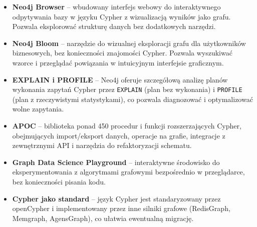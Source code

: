 \begin{itemize}
    \item \textbf{Neo4j Browser} -- wbudowany interfejs webowy do
    interaktywnego odpytywania bazy w języku Cypher z wizualizacją
    wyników jako grafu. Pozwala eksplorować strukturę danych bez
    dodatkowych narzędzi.
    \item \textbf{Neo4j Bloom} -- narzędzie do wizualnej eksploracji
    grafu dla użytkowników biznesowych, bez konieczności znajomości
    Cypher. Pozwala wyszukiwać wzorce i przeglądać powiązania
    w intuicyjnym interfejsie graficznym.
    \item \textbf{EXPLAIN i PROFILE} -- Neo4j oferuje szczegółową analizę
    planów wykonania zapytań Cypher przez \texttt{EXPLAIN} (plan bez
    wykonania) i \texttt{PROFILE} (plan z rzeczywistymi statystykami),
    co pozwala diagnozować i optymalizować wolne zapytania.
    \item \textbf{APOC} -- biblioteka ponad 450 procedur i funkcji
    rozszerzających Cypher, obejmujących import/eksport danych, operacje
    na grafie, integracje z zewnętrznymi API i narzędzia do refaktoryzacji
    schematu.
    \item \textbf{Graph Data Science Playground} -- interaktywne środowisko
    do eksperymentowania z algorytmami grafowymi bezpośrednio w przeglądarce,
    bez konieczności pisania kodu.
    \item \textbf{Cypher jako standard} -- język Cypher jest standaryzowany
    przez openCypher i implementowany przez inne silniki grafowe (RedisGraph,
    Memgraph, AgensGraph), co ułatwia ewentualną migrację.
\end{itemize}